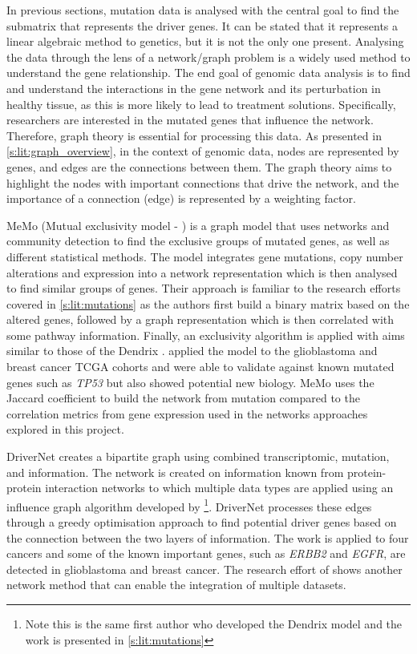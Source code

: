 In previous sections, mutation data is analysed with the central goal to find the submatrix that represents the driver genes. It can be stated that it represents a linear algebraic method to genetics, but it is not the only one present. Analysing the data through the lens of a network/graph problem is a widely used method to understand the gene relationship. The end goal of genomic data analysis is to find and understand the interactions in the gene network and its perturbation in healthy tissue, as this is more likely to lead to treatment solutions. Specifically, researchers are interested in the mutated genes that influence the network. Therefore, graph theory is essential for processing this data. As presented in \cref{s:lit:graph_overview}, in the context of genomic data, nodes are represented by genes, and edges are the connections between them. The graph theory aims to highlight the nodes with important connections that drive the network, and the importance of a connection (edge) is represented by a weighting factor.

MeMo (Mutual exclusivity model - \cite{Ciriello2012-hi}) is a graph model that uses networks and community detection to find the exclusive groups of mutated genes, as well as different statistical methods. The model integrates gene mutations, copy number alterations and expression into a network representation which is then analysed to find similar groups of genes. Their approach is familiar to the research efforts covered in \cref{s:lit:mutations} as the authors first build a binary matrix based on the altered genes, followed by a graph representation which is then correlated with some pathway information. Finally, an exclusivity algorithm is applied with aims similar to those of the Dendrix \citep{Vandin2012-cf}. \citet{Ciriello2012-hi} applied the model to the glioblastoma and breast cancer TCGA cohorts and were able to validate against known mutated genes such as \textit{TP53} but also showed potential new biology. MeMo uses the Jaccard coefficient to build the network from mutation compared to the correlation metrics from gene expression used in the networks approaches explored in this project. 

DriverNet \citep{Bashashati2012-lk} creates a bipartite graph using combined transcriptomic, mutation, and information. The network is created on information known from protein-protein interaction networks to which multiple data types are applied using an influence graph algorithm developed by \citet{Vandin2011-bs}\footnote{Note this is the same first author who developed the Dendrix model and the work is presented in \cref{s:lit:mutations}}. DriverNet processes these edges through a greedy optimisation approach to find potential driver genes based on the connection between the two layers of information. The work is applied to four cancers and some of the known important genes, such as \textit{ERBB2} and \textit{EGFR}, are detected in glioblastoma and breast cancer. The research effort of \citet{Bashashati2012-lk} shows another network method that can enable the integration of multiple datasets.

